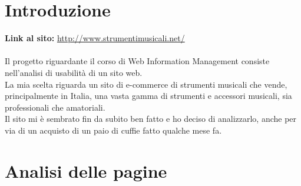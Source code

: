\documentclass[12pt]{article}
\begin{document}
\begin{titlepage}
		
		\vfill %
	\end{titlepage}
	\newpage
	\renewcommand{\contentsname}{Indice}
	\tableofcontents
	\newpage
	\listoffigures
	\newpage
	\section{Introduzione}
	\vspace {0.5cm}
	\textbf{Link al sito: }    \url{http://www.strumentimusicali.net/} \\
	\\
	Il progetto riguardante il corso di Web Information Management consiste nell'analisi di usabilità di un sito web.\\ La mia scelta riguarda un sito di e-commerce di strumenti musicali che vende, principalmente in Italia, una vasta gamma di strumenti e accessori musicali, sia professionali che amatoriali. 
	\\
	Il sito mi è sembrato fin da subito ben fatto e ho deciso di analizzarlo, anche per via di un acquisto di un paio di cuffie fatto qualche mese fa.
	\newpage
	\section{Analisi delle pagine}
\end{document}
